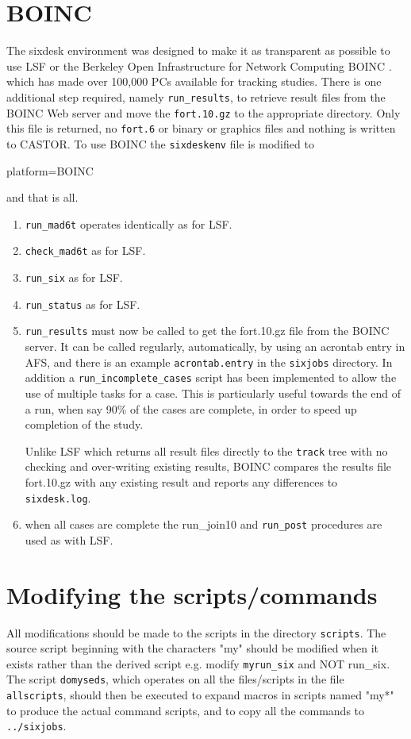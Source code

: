\documentclass{cernatsnote}    %
\begin{document}
\section{BOINC}
The sixdesk environment was designed to make it as transparent as possible
to use LSF or the 
Berkeley Open Infrastructure for Network Computing BOINC \cite{Boinc}.
which has made over 100,000 PCs available for tracking studies.
There is one additional step required, namely {\tt run\_results}, to
retrieve result files from the BOINC Web server 
and move the {\tt fort.10.gz} to the appropriate directory.
Only this file is returned, no {\tt fort.6} or binary
or graphics files and nothing is written to CASTOR.
To use BOINC the {\tt sixdeskenv} file is modified to
\begin{description}
\item[platform=BOINC]
\end{description}
and that is all.
\begin{enumerate}
\item {\tt run\_mad6t} operates identically as for LSF.
\item {\tt check\_mad6t} as for LSF.
\item {\tt run\_six} as for LSF. 
\item {\tt run\_status} as for LSF. 
\item {\tt run\_results} must now be called to get the fort.10.gz file from the
BOINC server. It can be called regularly, automatically, by using an acrontab
entry in AFS, and there is an example {\tt acrontab.entry} in the {\tt sixjobs}
directory. In addition a {\tt run\_incomplete\_cases} script has been implemented to
allow the use of multiple tasks for a case. This is particularly useful  
towards the end of a run,
when say 90\% of the cases are complete, in order 
to speed up completion of the study.

Unlike LSF which returns all result files directly to the {\tt track} tree
with no checking and over-writing existing results, BOINC 
compares the results file fort.10.gz with any existing result
and reports any differences to {\tt sixdesk.log}.
\item when all cases are complete the {run\_join10} and {\tt run\_post}
procedures are used as with LSF.
\end{enumerate}

\section{Modifying the scripts/commands}
All modifications should be made to the scripts in the directory
{\tt scripts}. The source script beginning with the characters
"my" should be modified when it exists rather than the derived script
e.g. modify {\tt myrun\_six} and NOT {run\_six}. The script {\tt domyseds},
which operates on all the files/scripts in the file {\tt allscripts},
should then be executed to expand macros in scripts named "my*" to
produce the actual command scripts, and to copy  all the commands
to {\tt ../sixjobs}.
\end{document}
